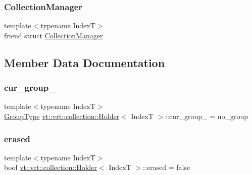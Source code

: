 \subsubsection{\texorpdfstring{Collection\+Manager}{CollectionManager}}
{\footnotesize\ttfamily template$<$typename IndexT$>$ \\
friend struct \hyperlink{structvt_1_1vrt_1_1collection_1_1_collection_manager}{Collection\+Manager}\hspace{0.3cm}{\ttfamily [friend]}}



\subsection{Member Data Documentation}
\mbox{\label{structvt_1_1vrt_1_1collection_1_1_holder_a18b94e933b0a02c15cbe747ac815a2e8}} 
\subsubsection{\texorpdfstring{cur\+\_\+group\+\_\+}{cur\_group\_}}
{\footnotesize\ttfamily template$<$typename IndexT$>$ \\
\hyperlink{namespacevt_a27b5e4411c9b6140c49100e050e2f743}{Group\+Type} \hyperlink{structvt_1_1vrt_1_1collection_1_1_holder}{vt\+::vrt\+::collection\+::\+Holder}$<$ IndexT $>$\+::cur\+\_\+group\+\_\+ = no\+\_\+group\hspace{0.3cm}{\ttfamily [private]}}

\mbox{\label{structvt_1_1vrt_1_1collection_1_1_holder_a8e12bc6e128cbf4829f13a578219a0be}} 
\subsubsection{\texorpdfstring{erased}{erased}}
{\footnotesize\ttfamily template$<$typename IndexT$>$ \\
bool \hyperlink{structvt_1_1vrt_1_1collection_1_1_holder}{vt\+::vrt\+::collection\+::\+Holder}$<$ IndexT $>$\+::erased = false\hspace{0.3cm}{\ttfamily [private]}}

